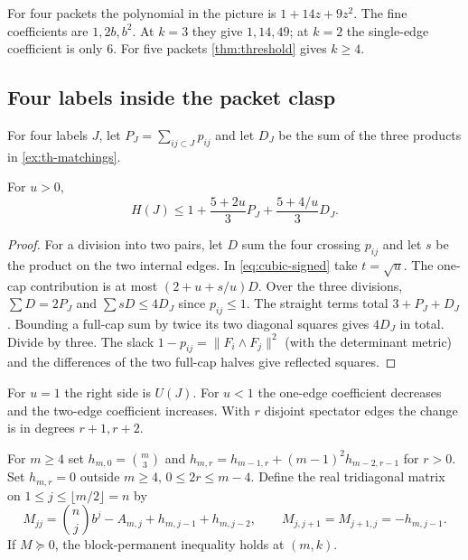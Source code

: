 \documentclass[a4paper,11pt]{amsart}
\numberwithin{equation}{subsection}
\theoremstyle{plain}
\theoremstyle{definition}
\begin{document}
\begin{example}
For four packets the polynomial in the picture is $1+14z+9z^2$. The fine coefficients are $1,2b,b^2$. At $k=3$ they give $1,14,49$; at $k=2$ the single-edge coefficient is only $6$.
For five packets \autoref{thm:threshold} gives $k\ge4$.
\end{example}

\subsection{Four labels inside the packet clasp}

For four labels $J$, let $P_J=\sum_{ij\subset J}p_{ij}$ and let $D_J$ be the sum of the three products in \autoref{ex:th-matchings}.

\begin{lemma}
For $u>0$,
\begin{equation}\label{eq:th-trade}
H(J)\le 1+\frac{5+2u}{3}P_J+\frac{5+4/u}{3}D_J .
\end{equation}
\end{lemma}

\begin{proof}
For a division into two pairs, let $D$ sum the four crossing $p_{ij}$ and let $s$ be the product on the two internal edges. In \autoref{eq:cubic-signed} take $t=\sqrt u$. The one-cap contribution is at most $(2+u+s/u)D$. Over the three divisions, $\sum D=2P_J$ and $\sum sD\le4D_J$ since $p_{ij}\le1$. The straight terms total $3+P_J+D_J$. Bounding a full-cap sum by twice its two diagonal squares gives $4D_J$ in total. Divide by three. The slack $1-p_{ij}=\|F_i\wedge F_j\|^2$ (with the determinant metric) and the differences of the two full-cap halves give reflected squares.
\end{proof}

For $u=1$ the right side is $U(J)$. For $u<1$ the one-edge coefficient decreases and the two-edge coefficient increases. With $r$ disjoint spectator edges the change is in degrees $r+1,r+2$.

\begin{lemma}\label{prop:th-matrix}
For $m\ge4$ set $h_{m,0}=\binom m3$ and $h_{m,r}=h_{m-1,r}+(m-1)^2h_{m-2,r-1}$ for $r>0$. Set $h_{m,r}=0$ outside $m\ge4$, $0\le2r\le m-4$. Define the real tridiagonal matrix on $1\le j\le\lfloor m/2\rfloor=n$ by
\[
M_{jj}=\binom nj b^j-A_{m,j}+h_{m,j-1}+h_{m,j-2},
\qquad M_{j,j+1}=M_{j+1,j}=-h_{m,j-1}.
\]
If $M\succeq0$, the block-permanent inequality holds at $(m,k)$.
\end{lemma}
\end{document}
